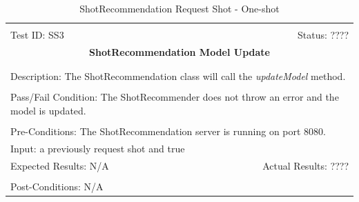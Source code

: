 \documentclass[11pt]{article}
\begin{document}
\begin{center}
\begin{table}[H]
\begin{tabular}{|l r|}\hline&\\[-2mm]
	Test ID: SS3	&Status: ????\\[-3mm]
	\multicolumn{2}{|c|}{\textbf{\large{ShotRecommendation Model Update}}}\\&\\\hline&\\[-3mm]
	\multicolumn{2}{|p{\textwidth}|}{Description: The ShotRecommendation class will call the \textit{updateModel} method.}\\[1mm]\hline&\\[-3mm]
	\multicolumn{2}{|p{\textwidth}|}{Pass/Fail Condition: The ShotRecommender does not throw an error and the model is updated.}\\[1mm]\hline&\\[-3mm]
	\multicolumn{2}{|p{\textwidth}|}{Pre-Conditions: The ShotRecommendation server is running on port 8080.}\\[4mm]
	\multicolumn{2}{|p{\textwidth}|}{Input: a previously request shot and true}\\[2mm]\hline
	\multicolumn{1}{|p{0.49\textwidth}}{Expected Results: N/A}	&\multicolumn{1}{|p{0.45\textwidth}|}{Actual Results: ????}\\\hline&\\[-3mm]
	\multicolumn{2}{|p{\textwidth}|}{Post-Conditions: N/A}\\\hline
\end{tabular}
\caption{ShotRecommendation Request Shot - One-shot}
\end{table}
\end{center}
\end{document}
